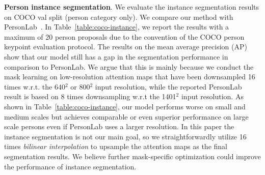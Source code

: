 \documentclass{article} \usepackage{iclr_conference,times}
\begin{document}
{\bf Person instance segmentation}. We evaluate the instance segmentation results on COCO val split (person category only). We compare our method with PersonLab~\citep{personlab:papandreou2018personlab}. In Table~\ref{table:coco-instance}, we report the results with a maximum of 20 person proposals due to the convention of the COCO person keypoint evaluation protocol. The results on the mean average precision (AP) show that our model still has a gap in the segmentation performance in comparison to PersonLab. We argue that this is mainly because we conduct the mask learning on low-resolution attention maps that have been downsampled 16 times w.r.t. the 640$^2$ or 800$^2$ input resolution, while the reported PersonLab result is based on 8 times downsampling w.r.t the 1401$^2$ input resolution. As shown in Table~\ref{table:coco-instance}, our model performs worse on small and medium scales but achieves comparable or even superior performance on large scale persons even if PersonLab uses a larger resolution. In this paper the instance segmentation is not our main goal, so we straightforwardly utilize 16 times \textit{bilinear interpolation} to upsample the attention maps as the final segmentation results. We believe further mask-specific optimization could improve the performance of instance segmentation.

\begin{table}[t]
\caption{Instance segmentation results (person class only) obtained with 20 proposals per image on the COCO  validation set.}
\label{table:coco-instance}
\begin{center}
\end{center}
 \vspace{-2em}
\end{table}
\end{document}
